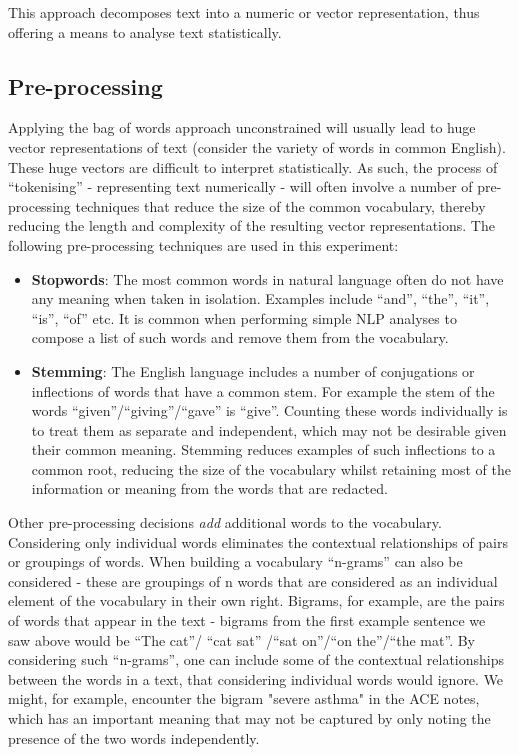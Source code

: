    This approach decomposes text into a numeric or vector representation, thus offering a means to analyse text statistically.

   \subsection{Pre-processing}\label{subsec:pre-processing}

   Applying the bag of words approach unconstrained will usually lead to huge vector representations of text (consider the variety of words in common English). These huge vectors are difficult to interpret statistically. As such, the process of ``tokenising'' - representing text numerically - will often involve a number of pre-processing techniques that reduce the size of the common vocabulary, thereby reducing the length and complexity of the resulting vector representations. The following pre-processing techniques are used in this experiment:

   \begin{itemize}
       \item \textbf{Stopwords}: The most common words in natural language often do not have any meaning when taken in isolation. Examples include ``and'', ``the'', ``it'', ``is'', ``of'' etc. It is common when performing simple NLP analyses to compose a list of such words and remove them from the vocabulary.
       \item \textbf{Stemming}: The English language includes a number of conjugations or inflections of words that have a common stem. For example the stem of the words ``given''/``giving''/``gave'' is ``give''. Counting these words individually is to treat them as separate and independent, which may not be desirable given their common meaning. Stemming reduces examples of such inflections to a common root, reducing the size of the vocabulary whilst retaining most of the information or meaning from the words that are redacted.
   \end{itemize}

   Other pre-processing decisions \textit{add} additional words to the vocabulary. Considering only individual words eliminates the contextual relationships of pairs or groupings of words. When building a vocabulary ``n-grams'' can also be considered - these are groupings of n words that are considered as an individual element of the vocabulary in their own right. Bigrams, for example, are the pairs of words that appear in the text - bigrams from the first example sentence we saw above would be ``The cat''/ ``cat sat'' /``sat on''/``on the''/``the mat''. By considering such ``n-grams'', one can include some of the contextual relationships between the words in a text, that considering individual words would ignore. We might, for example, encounter the bigram "severe asthma" in the ACE notes, which has an important meaning that may not be captured by only noting the presence of the two words independently.


